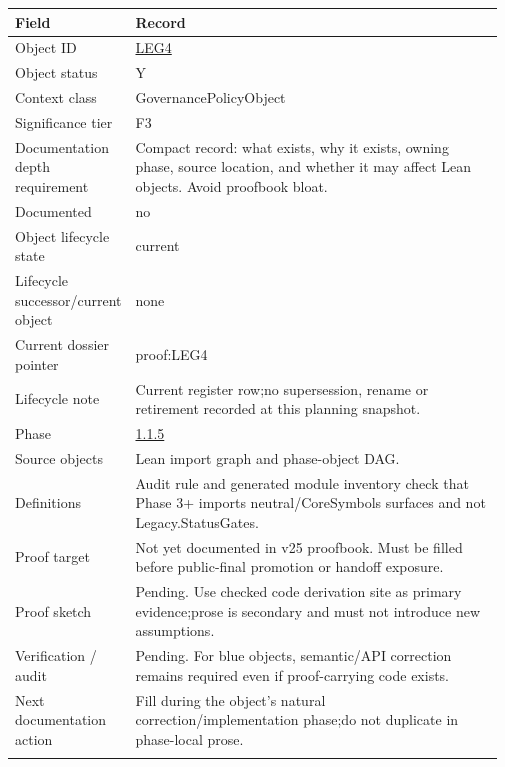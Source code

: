 \begin{longtable}{L{0.16\linewidth} L{0.81\linewidth}}
\hline
\textbf{Field} & \textbf{Record}\\
\hline
Object ID & \hyperlink{object-row-LEG4}{LEG4}\\
\hline\addlinespace[0.20em]
Object status & Y\\
\hline\addlinespace[0.20em]
Context class & GovernancePolicyObject\\
\hline\addlinespace[0.20em]
Significance tier & F3\\
\hline\addlinespace[0.20em]
Documentation depth requirement & Compact record: what exists, why it exists, owning phase, source location, and whether it may affect Lean objects. Avoid proofbook bloat.\\
\hline\addlinespace[0.20em]
Documented & no\\
\hline\addlinespace[0.20em]
Object lifecycle state & current\\
\hline\addlinespace[0.20em]
Lifecycle successor/\allowbreak{}current object & none\\
\hline\addlinespace[0.20em]
Current dossier pointer & proof:LEG4\\
\hline\addlinespace[0.20em]
Lifecycle note & Current register row;\newline no supersession, rename or retirement recorded at this planning snapshot.\\
\hline\addlinespace[0.20em]
Phase & \hyperlink{phase-row-1-1-5}{1.1.5}\\
\hline\addlinespace[0.20em]
Source objects & Lean import graph and phase-object DAG.\\
\hline\addlinespace[0.20em]
Definitions & Audit rule and generated module inventory check that Phase 3+ imports neutral/\allowbreak{}CoreSymbols surfaces and not Legacy.StatusGates.\\
\hline\addlinespace[0.20em]
Proof target & Not yet documented in v25 proofbook. Must be filled before public-final promotion or handoff exposure.\\
\hline\addlinespace[0.20em]
Proof sketch & Pending. Use checked code derivation site as primary evidence;\newline prose is secondary and must not introduce new assumptions.\\
\hline\addlinespace[0.20em]
Verification /\allowbreak{} audit & Pending. For blue objects, semantic/\allowbreak{}API correction remains required even if proof-carrying code exists.\\
\hline\addlinespace[0.20em]
Next documentation action & Fill during the object's natural correction/\allowbreak{}implementation phase;\newline do not duplicate in phase-local prose.\\
\hline\addlinespace[0.20em]
\end{longtable}
